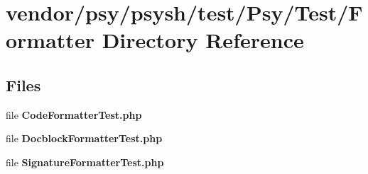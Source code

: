 \section{vendor/psy/psysh/test/\+Psy/\+Test/\+Formatter Directory Reference}
\label{dir_3e21dfcd3e779aedbbed38b663464f75}
\subsection*{Files}
\begin{DoxyCompactItemize}
\item 
file {\bf Code\+Formatter\+Test.\+php}
\item 
file {\bf Docblock\+Formatter\+Test.\+php}
\item 
file {\bf Signature\+Formatter\+Test.\+php}
\end{DoxyCompactItemize}
